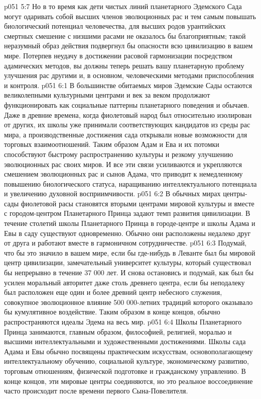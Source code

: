 \vs p051 5:7 Но в то время как дети чистых линий планетарного Эдемского Сада могут одаривать собой высших членов эволюционных рас и тем самым повышать биологический потенциал человечества, для высших родов урантийских смертных смешение с низшими расами не оказалось бы благоприятным; такой неразумный образ действия подвергнул бы опасности всю цивилизацию в вашем мире. Потерпев неудачу в достижении расовой гармонизации посредством адамических методов, вы должны теперь решать вашу планетарную проблему улучшения рас другими и, в основном, человеческими методами приспособления и контроля.
\vs p051 6:1 В большинстве обитаемых миров Эдемские Сады остаются великолепными культурными центрами и век за веком продолжают функционировать как социальные паттерны планетарного поведения и обычаев. Даже в древние времена, когда фиолетовый народ был относительно изолирован от других, их школы уже принимали соответствующих кандидатов из среды рас мира, а производственные достижения сада открывали новые возможности для торговых взаимоотношений. Таким образом Адам и Ева и их потомки способствуют быстрому распространению культуры и резкому улучшению эволюционных рас своих миров. И все эти связи усиливаются и укрепляются смешением эволюционных рас и сынов Адама, что приводит к немедленному повышению биологического статуса, наращиванию интеллектуального потенциала и увеличению духовной восприимчивости.
\vs p051 6:2 В обычных мирах центры\hyp{}сады фиолетовой расы становятся вторыми центрами мировой культуры и вместе с городом\hyp{}центром Планетарного Принца задают темп развития цивилизации. В течение столетий школы Планетарного Принца в городе\hyp{}центре и школы Адама и Евы в саду существуют одновременно. Обычно они расположены недалеко друг от друга и работают вместе в гармоничном сотрудничестве.
\vs p051 6:3 Подумай, что бы это значило в вашем мире, если бы где\hyp{}нибудь в Леванте был бы мировой центр цивилизации, замечательный университет культуры, который существовал бы непрерывно в течение 37 000 лет. И снова остановись и подумай, как был бы усилен моральный авторитет даже столь древнего центра, если бы неподалеку был расположен еще один и более древний центр небесного служения, совокупное эволюционное влияние 500 000\hyp{}летних традиций которого оказывало бы кумулятивное воздействие. Таким образом в конце концов, обычно распространяются идеалы Эдема на весь мир.
\vs p051 6:4 Школы Планетарного Принца занимаются, главным образом, философией, религией, моралью и высшими интеллектуальными и художественными достижениями. Школы сада Адама и Евы обычно посвящены практическим искусствам, основополагающему интеллектуальному обучению, социальной культуре, экономическому развитию, торговым отношениям, физической подготовке и гражданскому управлению. В конце концов, эти мировые центры соединяются, но это реальное воссоединение часто происходит после времени первого Сына\hyp{}Повелителя.
